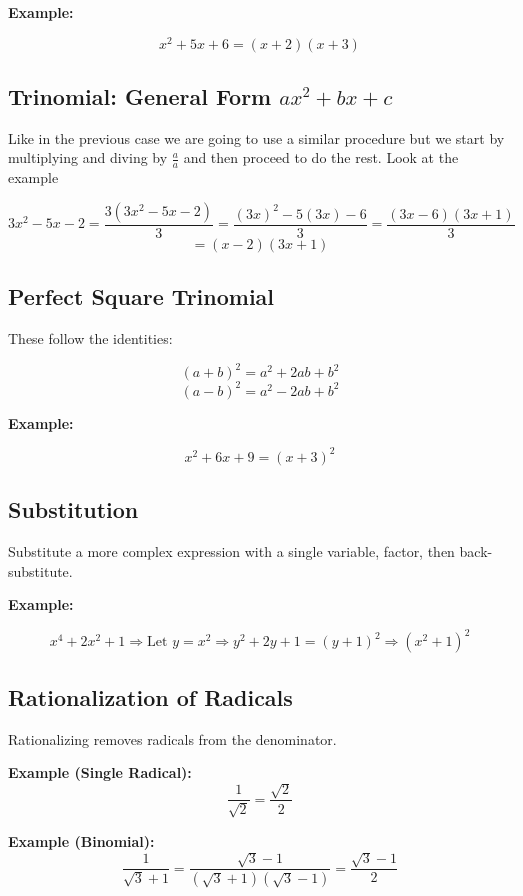 \textbf{Example:}

\[
x^2 + 5x + 6 = (x + 2)(x + 3)
\]


\subsection{Trinomial: General Form \texorpdfstring{\(ax^2 + bx + c\)}{ax² + bx + c}}

Like in the previous case we are going to use a similar procedure but we start by
multiplying and diving by \(\frac{a}{a}\) and then proceed to do the rest. Look at the example

\[
3x^2 -5x - 2 = \frac{3(3x^2 -5x - 2)}{3} = \frac{{(3x)}^2 -5(3x) - 6}{3} = \frac{(3x- 6)(3x+1)}{3} 
\]
\[
= (x- 2)(3x +1)
\]

\subsection{Perfect Square Trinomial}

These follow the identities:

\[
{(a + b)}^2 = a^2 + 2ab + b^2
\]
\[
{(a - b)}^2 = a^2 - 2ab + b^2
\]

\textbf{Example:}
\vspace{\baselineskip}

\[
x^2 + 6x + 9 = {(x + 3)}^2
\]

\subsection{Substitution}

Substitute a more complex expression with a single variable, factor, then back-substitute.
\vspace{\baselineskip}

\textbf{Example:}

\[
x^4 + 2x^2 + 1 \Rightarrow \text{Let } y = x^2 \Rightarrow y^2 + 2y + 1 = {(y + 1)}^2 \Rightarrow {(x^2 + 1)}^2
\]

\subsection{Rationalization of Radicals}

Rationalizing removes radicals from the denominator.
\vspace{\baselineskip}

\textbf{Example (Single Radical):}
\[
\frac{1}{\sqrt{2}} = \frac{\sqrt{2}}{2}
\]

\textbf{Example (Binomial):}
\[
\frac{1}{\sqrt{3} + 1} = \frac{\sqrt{3} - 1}{(\sqrt{3} + 1)(\sqrt{3} - 1)} = \frac{\sqrt{3} - 1}{2}
\]

